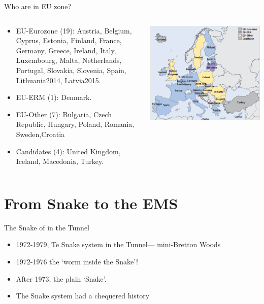 \documentclass[10pt,hyperref={CJKbookmarks=true},xcolor=dvipsnames,aspectratio=169]{beamer}
\begin{document}
\begin{frame}{Who are in EU zone?}
\begin{columns}[onlytextwidth]
	\begin{column}{0.4\textwidth}
		\begin{itemize}
			\item EU-Eurozone (19): Austria, Belgium, Cyprus,
			Estonia, Finland, France, Germany, Greece,
			Ireland, Italy, Luxembourg, Malta, Netherlands,
			Portugal, Slovakia, Slovenia, Spain, Lithuania2014, Latvia2015.
			\item EU-ERM (1): Denmark.
			\item EU-Other (7): Bulgaria, Czech Republic,
			Hungary, Poland, Romania, Sweden,Croatia
			\item Candidates (4): United
			Kingdom, Iceland, Macedonia,
			Turkey.

		\end{itemize}
	\end{column}
	\begin{column}{0.6\textwidth}
		\centering
\includegraphics[scale=0.33]{fig/euro/euzone}
	\end{column}
\end{columns}

\end{frame}


\section{From Snake to the EMS}
\begin{frame}{The Snake of in the Tunnel}
	\begin{itemize}
		\item 1972-1979, Te Snake system in the Tunnel--- mini-Bretton Woods
		\item 1972-1976 the ‘worm inside the Snake’!
		\item After 1973, the plain ‘Snake’.
		\item The Snake system had a chequered history
	\end{itemize}
\end{frame}
\end{document}
